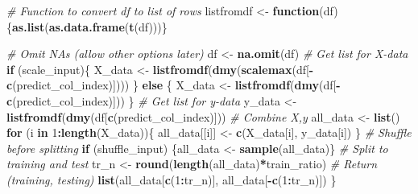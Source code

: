 \documentclass[]{book}
\newenvironment{Shaded}{\begin{snugshade}}{\end{snugshade}}
\newcommand{\CommentTok}[1]{\textcolor[rgb]{0.56,0.35,0.01}{\textit{#1}}}
\newcommand{\ControlFlowTok}[1]{\textcolor[rgb]{0.13,0.29,0.53}{\textbf{#1}}}
\newcommand{\DecValTok}[1]{\textcolor[rgb]{0.00,0.00,0.81}{#1}}
\newcommand{\KeywordTok}[1]{\textcolor[rgb]{0.13,0.29,0.53}{\textbf{#1}}}
\newcommand{\NormalTok}[1]{#1}
\newcommand{\OperatorTok}[1]{\textcolor[rgb]{0.81,0.36,0.00}{\textbf{#1}}}
\newcommand{\StringTok}[1]{\textcolor[rgb]{0.31,0.60,0.02}{#1}}
\begin{document}
\begin{Shaded}
\begin{Highlighting}[]
  \CommentTok{# Function to convert df to list of rows}
\NormalTok{  listfromdf <-}\StringTok{ }\ControlFlowTok{function}\NormalTok{(df)\{}\KeywordTok{as.list}\NormalTok{(}\KeywordTok{as.data.frame}\NormalTok{(}\KeywordTok{t}\NormalTok{(df)))\}}
  
  \CommentTok{# Omit NAs (allow other options later)}
\NormalTok{  df <-}\StringTok{ }\KeywordTok{na.omit}\NormalTok{(df)}
  \CommentTok{# Get list for X-data}
  \ControlFlowTok{if}\NormalTok{ (scale_input)\{}
\NormalTok{    X_data <-}\StringTok{ }\KeywordTok{listfromdf}\NormalTok{(}\KeywordTok{dmy}\NormalTok{(}\KeywordTok{scalemax}\NormalTok{(df[}\OperatorTok{-}\KeywordTok{c}\NormalTok{(predict_col_index)])))}
\NormalTok{  \} }\ControlFlowTok{else}\NormalTok{ \{}
\NormalTok{    X_data <-}\StringTok{ }\KeywordTok{listfromdf}\NormalTok{(}\KeywordTok{dmy}\NormalTok{(df[}\OperatorTok{-}\KeywordTok{c}\NormalTok{(predict_col_index)]))}
\NormalTok{  \}}
  \CommentTok{# Get list for y-data}
\NormalTok{  y_data <-}\StringTok{ }\KeywordTok{listfromdf}\NormalTok{(}\KeywordTok{dmy}\NormalTok{(df[}\KeywordTok{c}\NormalTok{(predict_col_index)]))}
  \CommentTok{# Combine X,y}
\NormalTok{  all_data <-}\StringTok{ }\KeywordTok{list}\NormalTok{()}
  \ControlFlowTok{for}\NormalTok{ (i }\ControlFlowTok{in} \DecValTok{1}\OperatorTok{:}\KeywordTok{length}\NormalTok{(X_data))\{}
\NormalTok{    all_data[[i]] <-}\StringTok{ }\KeywordTok{c}\NormalTok{(X_data[i], y_data[i])}
\NormalTok{  \}}
  \CommentTok{# Shuffle before splitting}
  \ControlFlowTok{if}\NormalTok{ (shuffle_input) \{all_data <-}\StringTok{ }\KeywordTok{sample}\NormalTok{(all_data)\}}
  \CommentTok{# Split to training and test}
\NormalTok{  tr_n <-}\StringTok{ }\KeywordTok{round}\NormalTok{(}\KeywordTok{length}\NormalTok{(all_data)}\OperatorTok{*}\NormalTok{train_ratio)}
  \CommentTok{# Return (training, testing)}
  \KeywordTok{list}\NormalTok{(all_data[}\KeywordTok{c}\NormalTok{(}\DecValTok{1}\OperatorTok{:}\NormalTok{tr_n)], all_data[}\OperatorTok{-}\KeywordTok{c}\NormalTok{(}\DecValTok{1}\OperatorTok{:}\NormalTok{tr_n)])}
\NormalTok{\}}
\end{Highlighting}
\end{Shaded}


\end{document}
